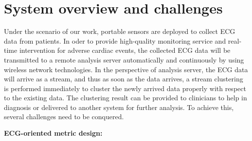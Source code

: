 \documentclass[conference]{IEEEtran}
\begin{document}
%



\section{System overview and challenges}
Under the scenario of our work, portable sensors are deployed to collect ECG data from patients. In oder to provide high-quality monitoring service and real-time intervention for adverse cardiac events, the collected ECG data will be transmitted to a remote analysis server automatically and continuously by using wireless network technologies. In the perspective of analysis server, the ECG data will arrive as a stream, and thus as soon as the data arrives, a stream clustering is performed immediately to cluster the newly arrived data properly with respect to the existing data. The clustering result can be provided to clinicians to help in diagnosis or delivered to another system for further analysis. To achieve this, several challenges need to be conquered.


\textbf{ECG-oriented metric design:}
\end{document}
